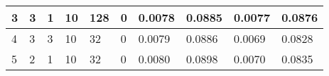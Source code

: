 \begin{table}
{\begin{tabular}{|llllllllll|}
3             & 3                                                               & 1                                                               & 10             & 128                                                            & 0                & 0.0078                                                                    & 0.0885                                                                   & 0.0077                                                               & 0.0876                                                              \\ \hline
4             & 3                                                               & 3                                                               & 10             & 32                                                             & 0                & 0.0079                                                                    & 0.0886                                                                   & 0.0069                                                               & 0.0828                                                              \\ \hline
5             & 2                                                               & 1                                                               & 10             & 32                                                             & 0                & 0.0080                                                                    & 0.0898                                                                   & 0.0070                                                               & 0.0835                                                              \\ \hline
\end{tabular}}
\end{table}




